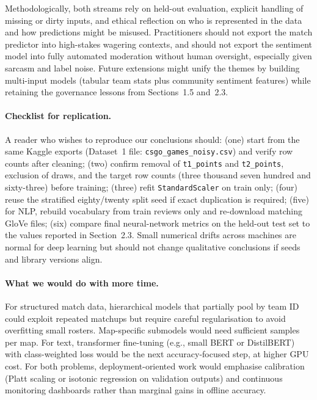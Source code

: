 \documentclass[12pt,a4paper]{article}
\begin{document}
Methodologically, both streams rely on held-out evaluation, explicit handling of missing or dirty inputs, and ethical reflection on who is represented in the data and how predictions might be misused. Practitioners should not export the match predictor into high-stakes wagering contexts, and should not export the sentiment model into fully automated moderation without human oversight, especially given sarcasm and label noise. Future extensions might unify the themes by building multi-input models (tabular team stats plus community sentiment features) while retaining the governance lessons from Sections~1.5 and~2.3.

\paragraph{Checklist for replication.}
A reader who wishes to reproduce our conclusions should: (one) start from the same Kaggle exports (Dataset~1 file: \texttt{csgo\_games\_noisy.csv}) and verify row counts after cleaning; (two) confirm removal of \texttt{t1\_points} and \texttt{t2\_points}, exclusion of draws, and the target row counts (three thousand seven hundred and sixty-three) before training; (three) refit \texttt{StandardScaler} on train only; (four) reuse the stratified eighty/twenty split seed if exact duplication is required; (five) for NLP, rebuild vocabulary from train reviews only and re-download matching GloVe files; (six) compare final neural-network metrics on the held-out test set to the values reported in Section~2.3. Small numerical drifts across machines are normal for deep learning but should not change qualitative conclusions if seeds and library versions align.

\paragraph{What we would do with more time.}
For structured match data, hierarchical models that partially pool by team ID could exploit repeated matchups but require careful regularisation to avoid overfitting small rosters. Map-specific submodels would need sufficient samples per map. For text, transformer fine-tuning (e.g., small BERT or DistilBERT) with class-weighted loss would be the next accuracy-focused step, at higher GPU cost. For both problems, deployment-oriented work would emphasise calibration (Platt scaling or isotonic regression on validation outputs) and continuous monitoring dashboards rather than marginal gains in offline accuracy.
\end{document}
